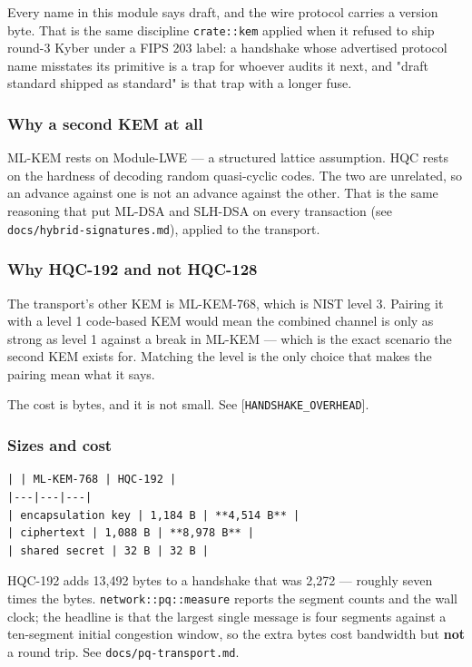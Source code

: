 \documentclass[11pt,a4paper]{article}
\begin{document}
Every name in this module says draft, and the wire protocol carries a
version byte. That is the same discipline \texttt{crate::kem} applied when it
refused to ship round-3 Kyber under a FIPS 203 label: a handshake whose
advertised protocol name misstates its primitive is a trap for whoever
audits it next, and "draft standard shipped as standard" is that trap with
a longer fuse.

\subsubsection{Why a second KEM at all}

ML-KEM rests on Module-LWE — a structured lattice assumption. HQC rests on
the hardness of decoding random quasi-cyclic codes. The two are unrelated,
so an advance against one is not an advance against the other. That is the
same reasoning that put ML-DSA and SLH-DSA on every transaction (see
\texttt{docs/hybrid-signatures.md}), applied to the transport.

\subsubsection{Why HQC-192 and not HQC-128}

The transport's other KEM is ML-KEM-768, which is NIST level 3. Pairing it
with a level 1 code-based KEM would mean the combined channel is only as
strong as level 1 against a break in ML-KEM — which is the exact scenario
the second KEM exists for. Matching the level is the only choice that makes
the pairing mean what it says.

The cost is bytes, and it is not small. See [\texttt{HANDSHAKE\_OVERHEAD}].

\subsubsection{Sizes and cost}

\begin{verbatim}
| | ML-KEM-768 | HQC-192 |
|---|---|---|
| encapsulation key | 1,184 B | **4,514 B** |
| ciphertext | 1,088 B | **8,978 B** |
| shared secret | 32 B | 32 B |
\end{verbatim}

HQC-192 adds 13,492 bytes to a handshake that was 2,272 — roughly seven
times the bytes. \texttt{network::pq::measure} reports the segment counts and the
wall clock; the headline is that the largest single message is four segments
against a ten-segment initial congestion window, so the extra bytes cost
bandwidth but \textbf{not} a round trip. See \texttt{docs/pq-transport.md}.
\end{document}
